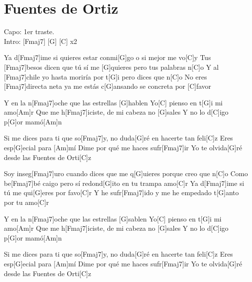 \section{Fuentes de Ortiz}


\vspace{1cm}

\begin{guitar}

	\begin{multicols}{2}
	
		Capo: 1er traste. \\
	
		Intro: \hspace{0.5cm} [Fmaj7] \hspace{0.5cm}[G] \hspace{0.5cm} [C] \hspace{0.3cm} x2
		
		\newline
	
		Ya d[Fmaj7]ime si quieres estar 
		conmi[G]go o si mejor me vo[C]y
		Tus [Fmaj7]besos dicen que tú sí 
		me [G]quieres pero tus palabras n[C]o
		Y al [Fmaj7]chile yo hasta moriría 
		por t[G]i pero dices que n[C]o
		No eres [Fmaj7]directa neta ya me 
		estás c[G]ansando se concreta por [C]favor
		
		\newline
		Y en la n[Fmaj7]oche que las estrellas [G]hablen 
		Yo[C] pienso en t[G]i mi amo[Am]r
		Que me h[Fmaj7]iciste, de mi cabeza no [G]sales
		Y no lo d[C]igo p[G]or mamó[Am]n
		
		Si me dices para ti que so[Fmaj7]y, no duda[G]ré en hacerte tan feli[C]z
		Eres esp[G]ecial para [Am]mí
		Dime por qué me haces sufr[Fmaj7]ir
		Yo te olvida[G]ré desde las Fuentes de Orti[C]z
		
		\newline
		Soy inseg[Fmaj7]uro cuando dices que 
		me q[G]uieres porque creo que n[C]o
		Como be[Fmaj7]bé caigo pero sí 
		redond[G]ito en tu trampa amo[C]r
		Ya d[Fmaj7]ime si tú 
		me qui[G]eres por favo[C]r
		Y he sufr[Fmaj7]ido y me he 
		empedado t[G]anto por tu amo[C]r
		
		\newline
		Y en la n[Fmaj7]oche que las estrellas [G]sablen 
		Yo[C] pienso en t[G]i mi amo[Am]r
		Que me h[Fmaj7]iciste, de mi cabeza no [G]sales
		Y no lo d[C]igo p[G]or mamó[Am]n
		
		Si me dices para ti que so[Fmaj7]y, no duda[G]ré en hacerte tan feli[C]z
		Eres esp[G]ecial para [Am]mí
		Dime por qué me haces sufr[Fmaj7]ir
		Yo te olvida[G]ré desde las Fuentes de Orti[C]z
		

\end{multicols}
\end{guitar}
